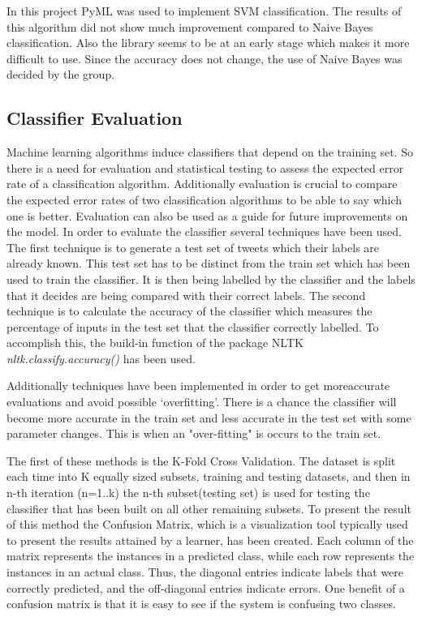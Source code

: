 In this project PyML\cite{website:pyml} was used to implement SVM
classification. The results of this algorithm did not show much improvement
compared to Naive Bayes classification. Also the library seems to be at an
early stage which makes it more difficult to use. Since the accuracy does not
change, the use of Naive Bayes was decided by the group.

\subsection{Classifier Evaluation} 
Machine learning algorithms induce classifiers that depend on the training set. So there is a need for evaluation and statistical testing to assess the expected error rate of a classification algorithm. Additionally evaluation is crucial to compare the expected error rates of two classification algorithms to be able to say which one is better. Evaluation can also be used as a guide for future improvements on the model. In order to evaluate the classifier several techniques have been used. The first technique is to generate a test set of tweets which their labels are already known. This test set has to be distinct from the train set which has been used to train the classifier. It is then being labelled by the classifier and the labels that it decides are being compared with their correct labels. The second technique is to calculate the accuracy of the classifier which measures the percentage of inputs in the test set that the classifier correctly labelled. To accomplish this, the build-in function of the package NLTK \emph{nltk.classify.accuracy()} has been used.

Additionally techniques have been implemented in order to get moreaccurate evaluations and avoid possible `overfitting'. There is a chance the classifier will become more accurate in the train set and less accurate in the test set with some parameter changes. This is when an "over-fitting" is occurs to the train set. 

The first of these methods is the K-Fold Cross Validation. The dataset is split each time into K equally sized subsets, training and testing datasets, and then in n-th iteration (n=1..k) the n-th subset(testing set) is used for testing the classifier that has been built on all other remaining subsets. To present the result of this method the Confusion Matrix, which is a visualization tool typically used to present the results attained by a learner, has been created. Each column of the matrix represents the instances in a predicted class, while each row represents the instances in an actual class. Thus, the diagonal entries indicate labels that were correctly predicted, and the off-diagonal entries indicate errors. One benefit of a confusion matrix is that it is easy to see if the system is confusing two classes.

